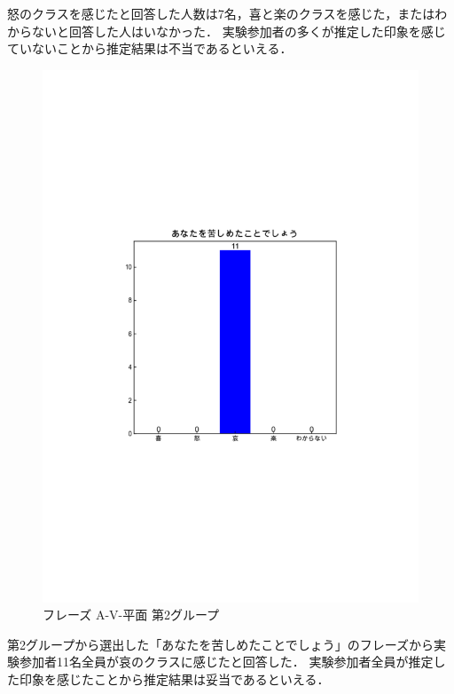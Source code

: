 怒のクラスを感じたと回答した人数は7名，喜と楽のクラスを感じた，またはわからないと回答した人はいなかった．
実験参加者の多くが推定した印象を感じていないことから推定結果は不当であるといえる．
\newpage
\begin{figure}[H]
    \centering
    \includegraphics[width=14cm]{438.pdf}
    \vspace{-1mm}
    \caption{フレーズ A-V-平面 第2グループ}
    \label{fig:mms}
    \vspace{5mm}
\end{figure}
第2グループから選出した「あなたを苦しめたことでしょう」のフレーズから実験参加者11名全員が哀のクラスに感じたと回答した．
実験参加者全員が推定した印象を感じたことから推定結果は妥当であるといえる．
\newpage
